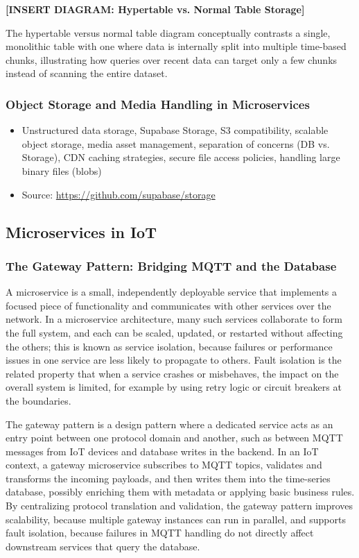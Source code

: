 \textbf{[INSERT DIAGRAM: Hypertable vs. Normal Table Storage]}

The hypertable versus normal table diagram conceptually contrasts a single, monolithic table with one where data is internally split into multiple time-based chunks, illustrating how queries over recent data can target only a few chunks instead of scanning the entire dataset.\cite{tigerdata_tsdb_vs_rdbms, tigerdata_caggs_retention}

\subsubsection{Object Storage and Media Handling in Microservices}
\begin{itemize}
    \item Unstructured data storage, Supabase Storage, S3 compatibility, scalable object storage, media asset management, separation of concerns (DB vs. Storage), CDN caching strategies, secure file access policies, handling large binary files (blobs)
    \item Source: \url{https://github.com/supabase/storage}
\end{itemize}

\subsection{Microservices in IoT}

\subsubsection{The Gateway Pattern: Bridging MQTT and the Database}
A microservice is a small, independently deployable service that implements a focused piece of functionality and communicates with other services over the network. In a microservice architecture, many such services collaborate to form the full system, and each can be scaled, updated, or restarted without affecting the others; this is known as service isolation, because failures or performance issues in one service are less likely to propagate to others. Fault isolation is the related property that when a service crashes or misbehaves, the impact on the overall system is limited, for example by using retry logic or circuit breakers at the boundaries.\cite{deepwiki_supabase_core}

The gateway pattern is a design pattern where a dedicated service acts as an entry point between one protocol domain and another, such as between MQTT messages from IoT devices and database writes in the backend. In an IoT context, a gateway microservice subscribes to MQTT topics, validates and transforms the incoming payloads, and then writes them into the time-series database, possibly enriching them with metadata or applying basic business rules. By centralizing protocol translation and validation, the gateway pattern improves scalability, because multiple gateway instances can run in parallel, and supports fault isolation, because failures in MQTT handling do not directly affect downstream services that query the database.\cite{microservices_io_gateway}

